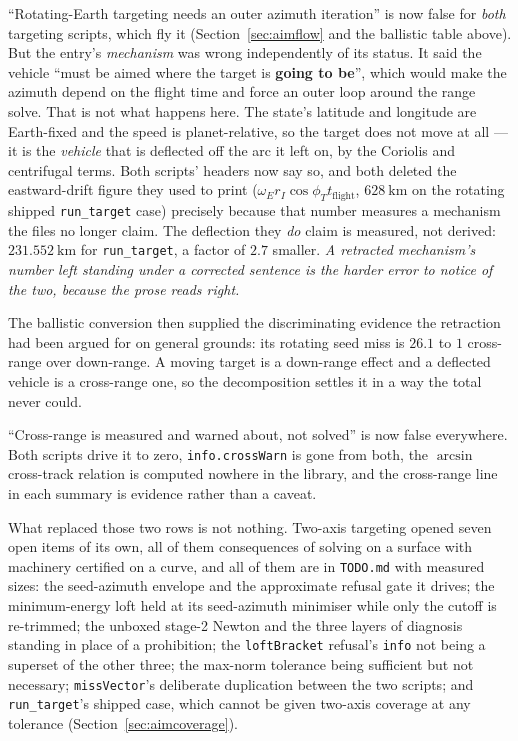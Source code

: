\documentclass[11pt]{article}
\newcommand{\code}[1]{\texttt{#1}}
\begin{document}
``Rotating-Earth targeting needs an outer azimuth iteration'' is now false for
\emph{both} targeting scripts, which fly it (Section~\ref{sec:aimflow} and the
ballistic table above). But the entry's \emph{mechanism} was wrong
independently of its status. It said the vehicle ``must be
aimed where the target is \textbf{going to be}'', which would make the azimuth
depend on the flight time and force an outer loop around the range solve. That
is not what happens here. The state's latitude and longitude are Earth-fixed
and the speed is planet-relative, so the target does not move at all --- it is
the \emph{vehicle} that is deflected off the arc it left on, by the Coriolis
and centrifugal terms. Both scripts' headers now say so, and both deleted the
eastward-drift figure they used to print
($\omega_E r_I \cos\phi_T t_{\text{flight}}$, $628~\mathrm{km}$ on the rotating
shipped \code{run\_target} case) precisely because that number measures a
mechanism the files no longer claim. The deflection they \emph{do} claim is
measured, not derived: $231.552~\mathrm{km}$ for \code{run\_target}, a factor
of $2.7$ smaller. \emph{A retracted mechanism's
number left standing under a corrected sentence is the harder error to notice
of the two, because the prose reads right.}

The ballistic conversion then supplied the discriminating evidence the
retraction had been argued for on general grounds: its rotating seed miss is
$26.1$ to $1$ cross-range over down-range. A moving target is a down-range
effect and a deflected vehicle is a cross-range one, so the decomposition
settles it in a way the total never could.

``Cross-range is measured and warned about, not solved'' is now false
everywhere. Both scripts drive it to zero, \code{info.crossWarn} is gone from
both, the $\arcsin$ cross-track relation is computed nowhere in the library,
and the cross-range line in each summary is evidence rather than a caveat.

What replaced those two rows is not nothing. Two-axis targeting opened seven
open items of its own, all of them consequences of solving on a surface with
machinery certified on a curve, and all of them are in \code{TODO.md} with
measured sizes: the seed-azimuth envelope and the approximate refusal gate it
drives; the minimum-energy loft held at its seed-azimuth minimiser while only
the cutoff is re-trimmed; the unboxed stage-2 Newton and the three layers of
diagnosis standing in place of a prohibition; the \code{loftBracket} refusal's
\code{info} not being a superset of the other three; the max-norm tolerance
being sufficient but not necessary; \code{missVector}'s deliberate duplication
between the two scripts; and \code{run\_target}'s shipped case, which cannot be
given two-axis coverage at any tolerance (Section~\ref{sec:aimcoverage}).
\end{document}
